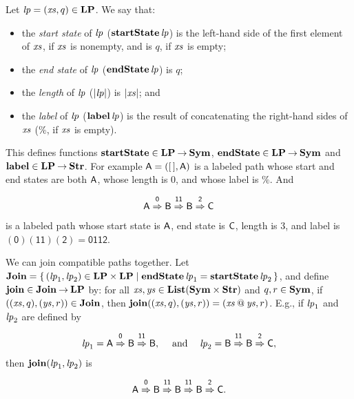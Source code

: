 Let ${\it lp}=({\it xs},q)\in\mathbf{LP}$.
We say that:
\begin{itemize}
\item the \emph{start state} of ${\it lp}$ ($\mathbf{startState}\,{\it lp}$) is
  the left-hand side of the first element of ${\it xs}$, if ${\it xs}$ is nonempty,
  and is $q$, if ${\it xs}$ is empty;

\item the \emph{end state} of ${\it lp}$ ($\mathbf{endState}\,{\it lp}$) is $q$;

\item the \emph{length} of ${\it lp}$ ($|{\it lp}|$) is $|{\it xs}|$; and

\item the \emph{label} of ${\it lp}$ ($\mathbf{label}\,{\it lp}$) is the result of
  concatenating the right-hand sides of ${\it xs}$ ($\%$, if ${\it xs}$ is
  empty).
\end{itemize}
%
%
%
%

This defines functions $\mathbf{startState}\in\mathbf{LP}\mathbin{\to}\mathbf{Sym}$,
$\mathbf{endState}\in\mathbf{LP}\mathbin{\to}\mathbf{Sym}$ and $\mathbf{label}\in\mathbf{LP}\mathbin{\to}\mathbf{Str}$.
For example $\mathsf{A} = ([\,],\mathsf{A})$
is a labeled path whose start and end states are both $\mathsf{A}$, whose
length is $0$, and whose label is $\%$.  And
\begin{gather*}
\mathsf{A}\stackrel{\strut\mathsf{0}}{\Rightarrow}\mathsf{B}\stackrel{\strut\mathsf{11}}{\Rightarrow}\mathsf{B}\stackrel{\strut\mathsf{2}}{\Rightarrow}\mathsf{C}
\end{gather*}
is a labeled path whose start state is $\mathsf{A}$, end state is $\mathsf{C}$,
length is $3$, and label is $\mathsf{(0)(11)(2)}=\mathsf{0112}$.

We can join compatible paths together.  Let $\mathbf{Join}=
\{ \, ({\it lp}_1,{\it lp}_2)\in\mathbf{LP}\times\mathbf{LP} \mid \mathbf{endState}\,{\it lp}_1 = \mathbf{startState}\,{\it lp}_2 \, \}$,
and define $\mathbf{join}\in\mathbf{Join}\mathbin{\to}\mathbf{LP}$ by: for all ${\it xs},{\it ys}\in\mathbf{List}(\mathbf{Sym}\times\mathbf{Str})$
%
and $q,r\in\mathbf{Sym}$, if $(({\it xs},q),({\it ys},r))\in\mathbf{Join}$, then
$\mathbf{join}(({\it xs},q), ({\it ys},r)) = ({\it xs}\mathbin{@}{\it ys}, r)$.  E.g., if
${\it lp}_1$ and ${\it lp}_2$ are defined by
\begin{gather*}
{\it lp}_1 = 
\mathsf{A}\stackrel{\strut\mathsf{0}}{\Rightarrow}\mathsf{B}\stackrel{\strut\mathsf{11}}{\Rightarrow}\mathsf{B} , \quad\;\allowbreak\mbox{and}\allowbreak\;\quad
{\it lp}_2 =
\mathsf{B}\stackrel{\strut\mathsf{11}}{\Rightarrow}\mathsf{B}\stackrel{\strut\mathsf{2}}{\Rightarrow}\mathsf{C} ,
\end{gather*}
then $\mathbf{join}({\it lp}_1,{\it lp}_2)$ is
\begin{gather*}
\mathsf{A}\stackrel{\strut\mathsf{0}}{\Rightarrow}\mathsf{B}\stackrel{\strut\mathsf{11}}{\Rightarrow}\mathsf{B}
\stackrel{\strut\mathsf{11}}{\Rightarrow}\mathsf{B}\stackrel{\strut\mathsf{2}}{\Rightarrow}\mathsf{C} .
\end{gather*}


